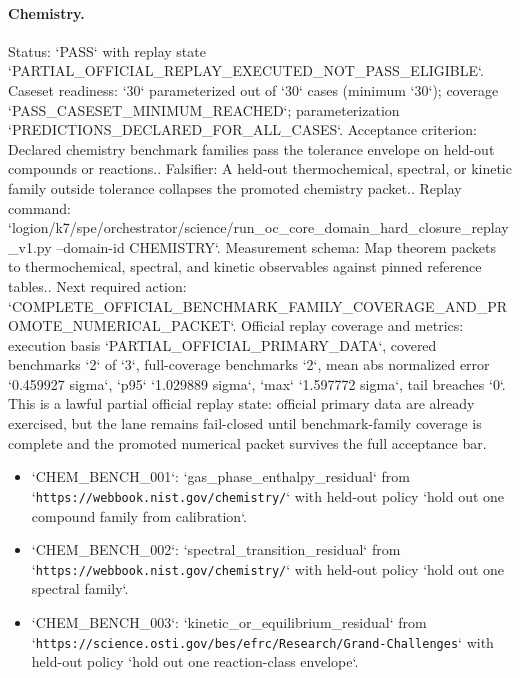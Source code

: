 \paragraph{Chemistry.}
Status: `PASS` with replay state `PARTIAL\_OFFICIAL\_REPLAY\_EXECUTED\_NOT\_PASS\_ELIGIBLE`.
Caseset readiness: `30` parameterized out of `30` cases (minimum `30`); coverage `PASS\_CASESET\_MINIMUM\_REACHED`; parameterization `PREDICTIONS\_DECLARED\_FOR\_ALL\_CASES`.
Acceptance criterion: Declared chemistry benchmark families pass the tolerance envelope on held-out compounds or reactions..
Falsifier: A held-out thermochemical, spectral, or kinetic family outside tolerance collapses the promoted chemistry packet..
Replay command: `logion/k7/spe/orchestrator/science/run\_oc\_core\_domain\_hard\_closure\_replay\_v1.py --domain-id CHEMISTRY`.
Measurement schema: Map theorem packets to thermochemical, spectral, and kinetic observables against pinned reference tables..
Next required action: `COMPLETE\_OFFICIAL\_BENCHMARK\_FAMILY\_COVERAGE\_AND\_PROMOTE\_NUMERICAL\_PACKET`.
Official replay coverage and metrics: execution basis `PARTIAL\_OFFICIAL\_PRIMARY\_DATA`, covered benchmarks `2` of `3`, full-coverage benchmarks `2`, mean abs normalized error `0.459927 sigma`, `p95` `1.029889 sigma`, `max` `1.597772 sigma`, tail breaches `0`.
This is a lawful partial official replay state: official primary data are already exercised, but the lane remains fail-closed until benchmark-family coverage is complete and the promoted numerical packet survives the full acceptance bar.
\begin{itemize}
\item `CHEM\_BENCH\_001`: `gas\_phase\_enthalpy\_residual` from `\texttt{https://webbook.nist.gov/chemistry/}` with held-out policy `hold out one compound family from calibration`.
\item `CHEM\_BENCH\_002`: `spectral\_transition\_residual` from `\texttt{https://webbook.nist.gov/chemistry/}` with held-out policy `hold out one spectral family`.
\item `CHEM\_BENCH\_003`: `kinetic\_or\_equilibrium\_residual` from `\texttt{https://science.osti.gov/bes/efrc/Research/Grand-Challenges}` with held-out policy `hold out one reaction-class envelope`.
\end{itemize}

